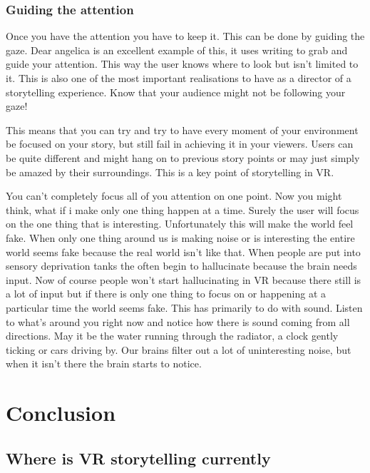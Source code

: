 \documentclass{report}
\begin{document}
				\subsection{Guiding the attention} 
				
				Once you have the attention you have to keep it. This can be done by guiding the gaze. Dear angelica is an excellent example of this, it uses writing to grab and guide your attention. This way the user knows where to look but isn't limited to it. This is also one of the most important realisations to have as a director of a storytelling experience. Know that your audience might not be following your gaze!
				
				This means that you can try and try to have every moment of your environment be focused on your story, but still fail in achieving it in your viewers. Users can be quite different and might hang on to previous story points or may just simply be amazed by their surroundings. This is a key point of storytelling in VR.
				
				You can't completely focus all of you attention on one point. Now you might think, what if i make only one thing happen at a time. Surely the user will focus on the one thing that is interesting. Unfortunately this will make the world feel fake. When only one thing around us is making noise or is interesting the entire world seems fake because the real world isn't like that. When people are put into sensory deprivation tanks the often begin to hallucinate because the brain needs input. Now of course people won't start hallucinating in VR because there still is a lot of input but if there is only one thing to focus on or happening at a particular time the world seems fake. 
				This has primarily to do with sound. Listen to what's around you right now and notice how there is sound coming from all directions. May it be the water running through the radiator, a clock gently ticking or cars driving by. Our brains filter out a lot of uninteresting noise, but when it isn't there the brain starts to notice.
				
								
				\chapter{Conclusion}
				\section{Where is VR storytelling currently}
				
\end{document}
